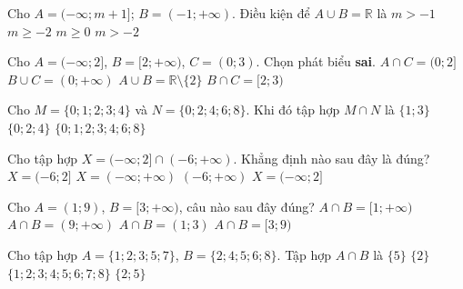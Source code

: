 \begin{ex}%
	Cho $A=(-\infty;m+1]$; $B=(-1;+\infty)$. Điều  kiện để $A\cup B=\mathbb{R}$ là
	\choice 
		 {$m>-1$}
		 {\True $m\geqslant -2$}
		{$m\geqslant 0$} 
		 {$m>-2$}
\end{ex}

\begin{ex}%
	 Cho $A=(-\infty;2]$, $B=[2;+\infty)$, $C=(0;3)$. Chọn phát biểu \textbf{sai}.
	 \choice
		{$A\cap C=(0;2]$} 
		 {$B\cup C=(0;+\infty)$}
		{\True $A\cup  B=\mathbb{R}\setminus \{2\}$}
		 {$B\cap C=[2;3)$}
\end{ex}

\begin{ex}%
	Cho $M=\lbrace 0;1;2;3;4 \rbrace$ và $N= \lbrace 0;2;4;6;8 \rbrace$. Khi đó tập hợp $M \cap  N$ là
		{$\lbrace 1;3  \rbrace$}
		{\True $ \lbrace 0;2;4 \rbrace$} 
		{$\lbrace  0;1;2;3;4;6;8 \rbrace $}
\end{ex}

\begin{ex}%
	Cho tập hợp $X=(-\infty;2] \cap (-6;+\infty)$. Khẳng định  nào sau đây là đúng?
	 \choice
		{\True $X=(-6;2]$} 
		 {$X=(-\infty;+\infty)$}
		 {$(-6;+\infty)$}
		{$X=(-\infty;2]$} 
	 \loigiai{
	Ta  có: $X=(-\infty;2] \cap (-6;+\infty)=(-6;2]$.}
\end{ex}

\begin{ex}%
	Cho $A=\left(1;9\right)$, $B=[3;+\infty)$, câu nào sau đây đúng? 
	 \choice
		 {$A\cap B=[1;+\infty)$}
		{$A\cap  B=(9;+\infty)$}
		 {$A\cap B=(1;3)$}
		{\True  $A\cap B=[3;9)$}
	 \loigiai{
	 $$A\cap B=\left(1;9\right)\cap \left[3;+\infty \right)=\left[3;9\right).$$}
\end{ex}

\begin{ex}%
	Cho tập  hợp $A=\{1;2;3;5;7\}$, $B=\{2;4;5;6;8\}$. Tập hợp $A \cap B$ là
	 \choice
		{$\{5\}$} 
		 {$\{2\}$}
		 {$\{1;2;3;4;5;6;7;8\}$}
		 {\True $\{2;5\}$}
\end{ex}

